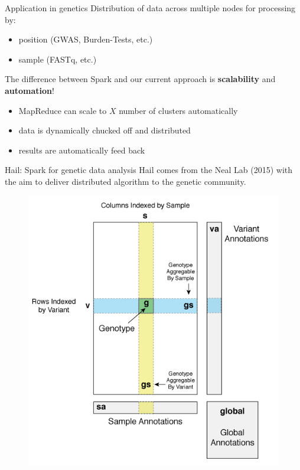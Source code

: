 \documentclass{beamer}
\begin{document}
\begin{frame}{Application in genetics}
  Distribution of data across multiple nodes for processing by:
  \begin{itemize}
    \item position (GWAS, Burden-Tests, etc.)
    \item sample (FASTq, etc.)
  \end{itemize}
  The difference between Spark and our current approach is \textbf{scalability} and \textbf{automation}!
  \begin{itemize}
    \item MapReduce can scale to $X$ number of clusters automatically
    \item data is dynamically chucked off and distributed
    \item results are automatically feed back
  \end{itemize}
\end{frame}

\begin{frame}{Hail: Spark for genetic data analysis}
  Hail comes from the Neal Lab (2015) with the aim to deliver distributed algorithm to the genetic community.
  \begin{figure}
    \includegraphics[scale=0.33]{figure/hail-vds-rep.png}
  \end{figure}
\end{frame}
\end{document}
